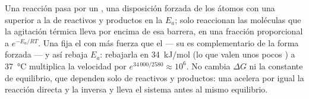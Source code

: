 \begin{proposition}\label{prop:b1:enzymes:whatitdoes}
Una reacción pasa por un \emph{}, una disposición
forzada de los átomos con una  superior a la de reactivos y
productos en la \emph{} $E_a$; solo reaccionan las
moléculas que la agitación térmica lleva por encima de esa barrera, en una
fracción proporcional a $e^{-E_a/RT}$. Una  fija el  con más fuerza que el  --- su  es
complementario de la forma forzada --- y así rebaja $E_a$: rebajarla en
\qty{34}{kJ/mol} (lo que valen unos pocos ) a
\qty{37}{\celsius} multiplica la velocidad por $e^{34\,000/2580} \approx
10^6$. No cambia $\Delta G$ ni la constante de equilibrio, que dependen solo
de reactivos y productos: una  acelera por igual la reacción directa y
la inversa y lleva el sistema antes al mismo equilibrio.
\end{proposition}

